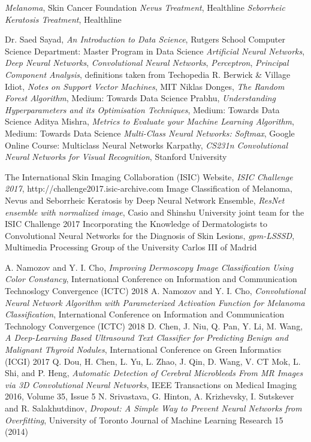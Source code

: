 \documentclass[10pt]{IEEEtran}
\begin{document}
\begin{thebibliography}{9} %

\emph{Melanoma}, Skin Cancer Foundation
\emph{Nevus Treatment}, Healthline
\emph{Seborrheic Keratosis Treatment}, Healthline

Dr. Saed Sayad, \emph{An Introduction to Data Science}, Rutgers School Computer Science Department: Master Program in Data Science
\emph{Artificial Neural Networks}, \emph{Deep Neural Networks}, \emph{Convolutional Neural Networks}, \emph{Perceptron}, \emph{Principal Component Analysis}, definitions taken from Techopedia
R. Berwick \& Village Idiot, \emph{Notes on Support Vector Machines}, MIT
Niklas Donges, \emph{The Random Forest Algorithm}, Medium: Towards Data Science
Prabhu, \emph{Understanding Hyperparameters and its Optimisation Techniques}, Medium: Towards Data Science
Aditya Mishra, \emph{Metrics to Evaluate your Machine Learning Algorithm}, Medium: Towards Data Science
\emph{Multi-Class Neural Networks: Softmax}, Google Online Course: Multiclass Neural Networks
Karpathy, \emph{CS231n Convolutional Neural Networks for Visual Recognition}, Stanford University

The International Skin Imaging Collaboration (ISIC) Website, \emph{ISIC Challenge 2017}, http://challenge2017.isic-archive.com
Image Classification of Melanoma, Nevus and Seborrheic Keratosis by Deep Neural Network Ensemble, \emph{ResNet ensemble with normalized image}, Casio and Shinshu University joint team for the ISIC Challenge 2017
Incorporating the Knowledge of Dermatologists to Convolutional Neural Networks for the Diagnosis of Skin Lesions, \emph{gpm-LSSSD}, Multimedia Processing Group of the University Carlos III of Madrid

A. Namozov and Y. I. Cho, \emph{Improving Dermoscopy Image Classification Using Color Constancy}, International Conference on Information and Communication Technoslogy Convergence (ICTC) 2018
A. Namozov and Y. I. Cho, \emph{Convolutional Neural Network Algorithm with Parameterized Activation Function for Melanoma Classification}, International Conference on Information and Communication Technology Convergence (ICTC) 2018 
D. Chen, J. Niu, Q. Pan, Y. Li, M. Wang, \emph{A Deep-Learning Based Ultrasound Text Classifier for Predicting Benign and Malignant Thyroid Nodules}, International Conference on Green Informatics (ICGI) 2017
Q. Dou, H. Chen, L. Yu, L. Zhao, J. Qin, D. Wang, V. CT Mok, L. Shi, and P. Heng, \emph{Automatic Detection of Cerebral Microbleeds From MR Images via 3D Convolutional Neural Networks}, IEEE Transactions on Medical Imaging 2016, Volume 35, Issue 5
N. Srivastava, G. Hinton, A. Krizhevsky, I. Sutskever and R. Salakhutdinov, \emph{Dropout: A Simple Way to Prevent Neural Networks from Overfitting}, University of Toronto Journal of Machine Learning Research 15 (2014)


\end{thebibliography}
\end{document}
